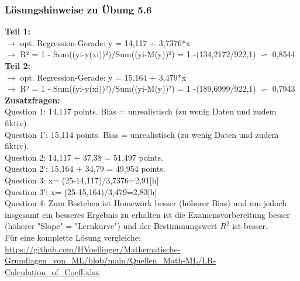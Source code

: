 \documentclass[12pt]{article}
\begin{document}
\subsubsection{Lösungshinweise zu Übung 5.6}
%
\textbf{Teil 1:}\\
$\rightarrow$ opt. Regression-Gerade:  y =  14,117 + 3,7376*x \\[0.3cm]
$\rightarrow$ R² = 1 - Sum((yi-y(xi))²)/Sum((yi-M(y))²) = 1 -(134,2172/922,1) $\backsim $ 0,8544 \\[0.3cm]	
%				
\textbf{Teil 2:}\\
$\rightarrow$ opt. Regression-Gerade:  y =  15,164 + 3,479*x \\[0.3cm]
$\rightarrow$ R² = 1 - Sum((yi-y(xi))²)/Sum((yi-M(y))²) = 1 -(189,6999/922,1) $\backsim $ 0,7943 \\[0.3cm]	
%				
							
\textbf{Zusatzfragen:}\\
%
Question 1:   14,117 points. Bias = unrealistisch (zu wenig Daten und zudem fiktiv).	\\[0.1cm]
Question 1': 15,114 points. Bias = unrealistisch (zu wenig Daten und zudem fiktiv).	\\[0.1cm]		
Question 2:  14,117 + 37,38 = 51,497 points.\\[0.1cm]
Question 2': 15,164 + 34,79 = 49,954 points.\\[0.1cm]		
Question 3:  x= (25-14,117)/3,7376=2,91[h] \\[0.3cm]	
Question 3': x= (25-15,164)/3,479=2,83[h] \\[0.3cm]	
Question 4: Zum Bestehen ist Homework besser (höherer Bias) und um jedoch insgesamt ein besseres Ergebnis zu erhalten ist die Examensvorbereitung besser (höherer "Slope" = "Lernkurve") und der Bestimmungswert $R^2$ ist besser.\\[0.3cm]	
%
\hspace*{0.0cm}Für eine komplette Lösung vergleiche:\\
\url{https://github.com/HVoellinger/Mathematische-Grundlagen_von_ML/blob/main/Quellen_Math-ML/LR-Calculation_of_Coeff.xlsx}
\end{document}
